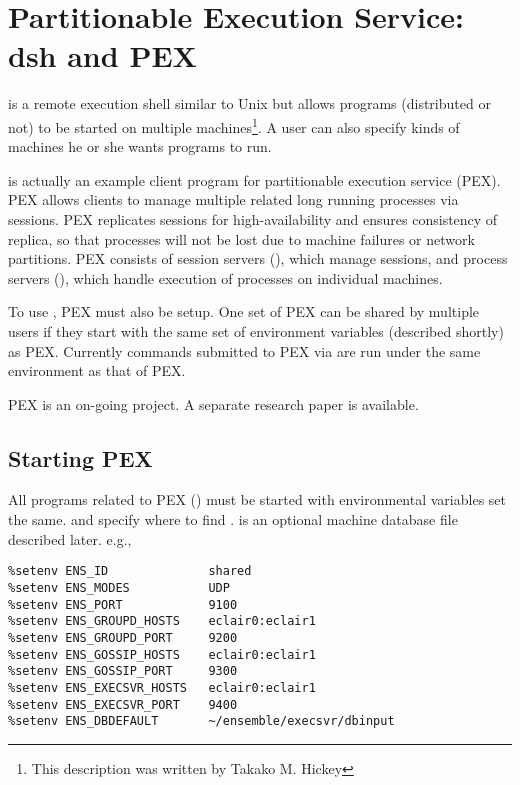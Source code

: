 \section{Partitionable Execution Service: dsh and PEX}

 is a remote execution shell similar to Unix
 but
allows programs (distributed or not) to be started on multiple
machines\footnote{This description was written by Takako M. Hickey}.
A user can also specify kinds of machines he or she wants
programs to run.
 
 is actually an example client program for partitionable
execution service (PEX).  PEX allows clients to manage
multiple related long running processes via sessions.
PEX replicates sessions for high-availability
and ensures consistency of replica, so that processes will not be
lost due to machine failures or network partitions.
PEX consists of session servers (), which manage sessions,
and process servers (), which handle execution of
processes on individual machines.
 
To use , PEX must also be setup.
One set of PEX can be shared by multiple users if they start
 with the same set of environment variables (described
shortly) as PEX.
Currently commands submitted to PEX via 
are run under the same environment as that of PEX.
 
PEX is an on-going project.  A separate research paper is available.


\subsection{Starting PEX}

All programs related to PEX () must be started with environmental variables
set the same.
 and 
specify where to find .
 is an optional machine database file described
later.  e.g.,

\begin{verbatim}
%setenv ENS_ID              shared
%setenv ENS_MODES           UDP
%setenv ENS_PORT            9100
%setenv ENS_GROUPD_HOSTS    eclair0:eclair1
%setenv ENS_GROUPD_PORT     9200
%setenv ENS_GOSSIP_HOSTS    eclair0:eclair1
%setenv ENS_GOSSIP_PORT     9300
%setenv ENS_EXECSVR_HOSTS   eclair0:eclair1
%setenv ENS_EXECSVR_PORT    9400
%setenv ENS_DBDEFAULT       ~/ensemble/execsvr/dbinput
\end{verbatim}
 
